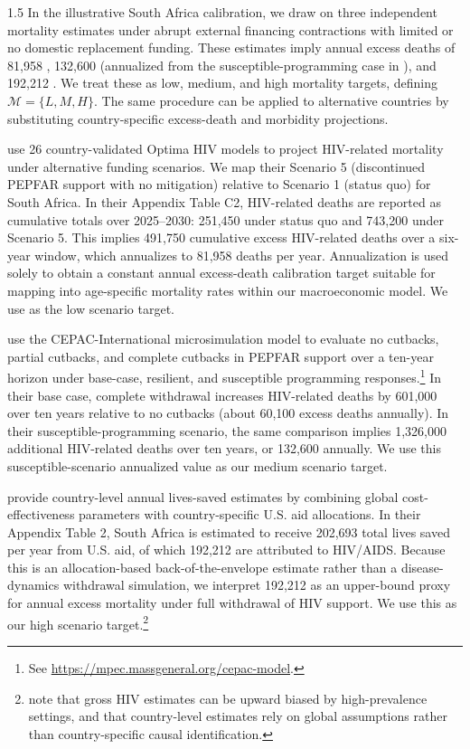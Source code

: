 \documentclass[letterpaper,12pt]{article}
\theoremstyle{definition}
\begin{document}
\begin{spacing}{1.5}
In the illustrative South Africa calibration, we draw on three independent mortality estimates under abrupt external financing contractions with limited or no domestic replacement funding. These estimates imply annual excess deaths of 81,958 \citep{Brink2025}, 132,600 (annualized from the susceptible-programming case in \citealp{Gandhi2025}), and 192,212 \citep{KS2025}. We treat these as low, medium, and high mortality targets, defining $\mathcal{M}=\{L,M,H\}$. The same procedure can be applied to alternative countries by substituting country-specific excess-death and morbidity projections.

\citet{Brink2025} use 26 country-validated Optima HIV models to project HIV-related mortality under alternative funding scenarios. We map their Scenario 5 (discontinued PEPFAR support with no mitigation) relative to Scenario 1 (status quo) for South Africa. In their Appendix Table C2, HIV-related deaths are reported as cumulative totals over 2025--2030: 251,450 under status quo and 743,200 under Scenario 5. This implies 491,750 cumulative excess HIV-related deaths over a six-year window, which annualizes to 81,958 deaths per year. Annualization is used solely to obtain a constant annual excess-death calibration target suitable for mapping into age-specific mortality rates within our macroeconomic model. We use \citet{Brink2025} as the low scenario target.

\citet{Gandhi2025} use the CEPAC-International microsimulation model to evaluate no cutbacks, partial cutbacks, and complete cutbacks in PEPFAR support over a ten-year horizon under base-case, resilient, and susceptible programming responses.\footnote{See \href{https://mpec.massgeneral.org/cepac-model}{https://mpec.massgeneral.org/cepac-model}.} In their base case, complete withdrawal increases HIV-related deaths by 601,000 over ten years relative to no cutbacks (about 60,100 excess deaths annually). In their susceptible-programming scenario, the same comparison implies 1,326,000 additional HIV-related deaths over ten years, or 132,600 annually. We use this susceptible-scenario annualized value as our medium scenario target.

\citet{KS2025} provide country-level annual lives-saved estimates by combining global cost-effectiveness parameters with country-specific U.S. aid allocations. In their Appendix Table 2, South Africa is estimated to receive 202,693 total lives saved per year from U.S. aid, of which 192,212 are attributed to HIV/AIDS. Because this is an allocation-based back-of-the-envelope estimate rather than a disease-dynamics withdrawal simulation, we interpret 192,212 as an upper-bound proxy for annual excess mortality under full withdrawal of HIV support. We use this as our high scenario target.\footnote{\citet{KS2025} note that gross HIV estimates can be upward biased by high-prevalence settings, and that country-level estimates rely on global assumptions rather than country-specific causal identification.}


\end{spacing}
\end{document}
